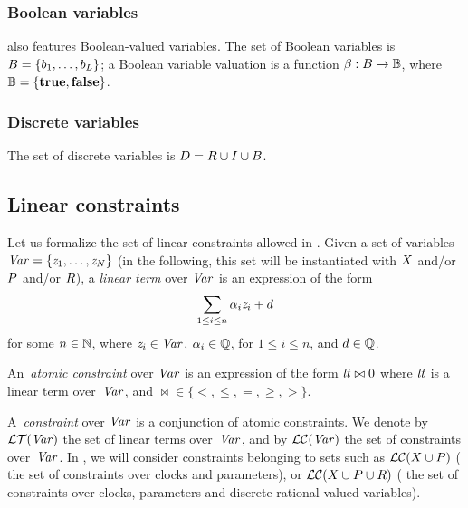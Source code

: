 \subsubsection{Boolean variables}

\imitator{} also features Boolean-valued variables.
The set of Boolean variables is $B = \{ b_1, \dots, b_L \} $;
a Boolean variable valuation is a function $\beta : B \rightarrow \mathbb B$, where $\mathbb B = \{\mathbf{true}, \mathbf{false} \}$.


\subsubsection{Discrete variables}

The set of discrete variables is $D = R \cup I \cup B $.



\subsection{Linear constraints}\label{ss:constraints}

Let us formalize the set of linear constraints allowed in \imitator{}.
Given a set of variables~$\mathit{Var} = \{ \mathit{z}_1, \dots, \mathit{z}_N \}$ (in the following, this set will be instantiated with $X$ and/or $P$ and/or $R$), a \emph{linear term} over $\mathit{Var}$ is an expression of the form
$$
	\sum_{1 \leq i \leq n} \alpha_i \mathit{z}_i + d
$$
for some $n \in \mathbb N$,
where
$\mathit{z}_{i} \in \mathit{Var}$,
$\alpha_{i} \in \mathbb Q$, for $1 \leq i \leq n$,
and
$d \in \mathbb Q$.

An~\emph{atomic constraint} over $\mathit{Var}$ is an expression of the form
$
	\mathit{lt} \bowtie 0
$
where
$\mathit{lt}$ is a linear term over~$\mathit{Var}$,
and
${\bowtie} \in \{ <, \leq, =, \geq, > \}$.

A~\emph{constraint} over $\mathit{Var}$ is a conjunction of atomic constraints.
We denote by $\mathcal{LT}(\mathit{Var})$ the set of linear terms over~$\mathit{Var}$, and by $\mathcal{LC}(\mathit{Var})$ the set of constraints over~$\mathit{Var}$.
In \imitator{}, we will consider constraints belonging to sets such as $\mathcal{LC}(X \cup P)$ (\ie{} the set of constraints over clocks and parameters), or $\mathcal{LC}(X \cup P \cup R)$ (\ie{} the set of constraints over clocks, parameters and discrete rational-valued variables).



